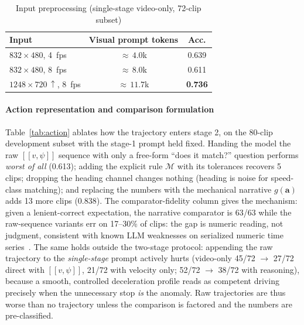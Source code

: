 \documentclass[conference]{IEEEtran}
\newcommand{\act}{\boldsymbol{a}}          %
\newcommand{\Mcal}{\mathcal{M}}            %
\begin{document}
\begin{table}[htbp]
\caption{Input preprocessing (single-stage video-only, 72-clip subset)}
\begin{center}
\small
\begin{tabular}{|l|c|c|}
\hline
\textbf{Input} & \textbf{Visual prompt tokens} & \textbf{Acc.} \\
\hline
$832\times480$, 4~fps & ${\approx}\,4.0$k & 0.639 \\
\hline
$832\times480$, 8~fps & ${\approx}\,8.0$k & 0.611 \\
\hline
$1248\times720\,{\uparrow}$, 8~fps & ${\approx}\,11.7$k & \textbf{0.736} \\
\hline
\end{tabular}
\label{tab:preproc}
\end{center}
\end{table}

\paragraph{Action representation and comparison formulation} Table~\ref{tab:action} ablates how the trajectory enters stage 2, on the 80-clip development subset with the stage-1 prompt held fixed. Handing the model the raw $[[v, \psi]]$ sequence with only a free-form ``does it match?'' question performs \emph{worst of all} (0.613); adding the explicit rule $\Mcal$ with its tolerances recovers 5 clips; dropping the heading channel changes nothing (heading is noise for speed-class matching); and replacing the numbers with the mechanical narrative $g(\act)$ adds 13 more clips (0.838). The comparator-fidelity column gives the mechanism: given a lenient-correct expectation, the narrative comparator is 63/63 while the raw-sequence variants err on 17--30\% of clips: the gap is numeric reading, not judgment, consistent with known LLM weaknesses on serialized numeric time series~\cite{b35,b36}. The same holds outside the two-stage protocol: appending the raw trajectory to the \emph{single-stage} prompt actively hurts (video-only 45/72 $\rightarrow$ 27/72 direct with $[[v, \psi]]$, 21/72 with velocity only; 52/72 $\rightarrow$ 38/72 with reasoning), because a smooth, controlled deceleration profile reads as competent driving precisely when the unnecessary stop \emph{is} the anomaly. Raw trajectories are thus worse than no trajectory unless the comparison is factored and the numbers are pre-classified.
\end{document}
